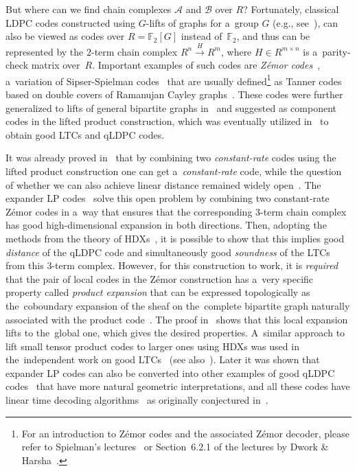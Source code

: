 \documentclass[conference]{IEEEtran}
\theoremstyle{plain}
\theoremstyle{definition}
\theoremstyle{remark}
\newcommand{\cA}{\mathcal{A}}
\newcommand{\cB}{\mathcal{B}}
\newcommand{\F}{\mathbb{F}}
\begin{document}
But where can we find chain complexes $\cA$ and $\cB$ over $R$? Fortunately, classical LDPC codes constructed using $G$-lifts of graphs for a~group $G$ (e.g., see~\cite[p.~3]{Panteleev&Kalachev:2021}), can also be viewed as codes over $R = \F_2[G]$ instead of~$\F_2$, and thus can be represented by the $2$-term chain complex $R^n\xrightarrow{H} R^m$, where $H\in R^{m\times n}$ is a~parity-check matrix over~$R$.
Important examples of such codes are \emph{Z\'{e}mor codes}~\cite{Zemor:2001}, a~variation of Sipser-Spielman codes~\cite{Sipser:1996} that are usually defined\footnote{For an introduction to Z\'{e}mor codes and the associated Z\'{e}mor decoder, please refer to Spielman’s lectures~\cite{Spielman2009SpectralGraphTheory} or Section~6.2.1 of the lectures by Dwork \& Harsha~\cite{dworkCS369EExpandersComputer}.} as Tanner codes~\cite{Tanner:1981} based on double covers of Ramanujan Cayley graphs~\cite{Margulis:1988, Lubotzky:1988}. These codes were further generalized to lifts of general bipartite graphs in~\cite{Panteleev&Kalachev:2021} and suggested as component codes in the lifted product construction, which was eventually utilized in~\cite{Panteleev&Kalachev:stoc2022} to obtain good LTCs and qLDPC codes.

It was already proved in~\cite[p.~8]{Panteleev&Kalachev:2021} that by combining two \emph{constant-rate} codes using the lifted product construction one can get a~\emph{constant-rate} code, while the question of whether we can also achieve linear distance remained widely open~\cite[p.~14]{Panteleev&Kalachev:2021}. The expander LP codes~\cite{Panteleev&Kalachev:stoc2022} solve this open problem by combining two constant-rate Z\'{e}mor codes in a~way that ensures that the corresponding 3-term chain complex has good high-dimensional expansion in both directions. Then, adopting the methods from the theory of HDXs~\cite{Kaufman:2014a, Kaufman:2014, Evra:2020}, it is possible to show that this implies good \emph{distance} of the qLDPC code and simultaneously good \emph{soundness} of the LTCs from this 3-term complex. However, for this construction to work, it is \emph{required} that the pair of local codes in the Z\'{e}mor construction has a~very specific property called \emph{product expansion} that can be expressed topologically as the~coboundary expansion of the sheaf on the~complete bipartite graph naturally associated with the product code~\cite{kalachevTwosidedRobustlyTestable2023}. The proof in~\cite{Panteleev&Kalachev:stoc2022} shows that this local expansion lifts to the~global one, which gives the desired properties. A~similar approach to lift small tensor product codes to larger ones using HDXs was used in the~independent work on good LTCs~\cite{Dinur:stoc2022} (see also~\cite{LiftingSmallLocally2019}).   
Later it was shown that expander LP codes can also be converted into other examples of good qLDPC codes~\cite{Leverrier:focs2022, Dinur:decoders} that have more natural geometric interpretations, and all these codes have linear time decoding algorithms~\cite{Gu:stoc2023:qpdpc-decoder, Leverrier:qldpcdecoder:2023, Dinur:decoders, guSingleShotDecodingGood2024} as originally conjectured in~\cite{Panteleev&Kalachev:stoc2022}. 
\end{document}
